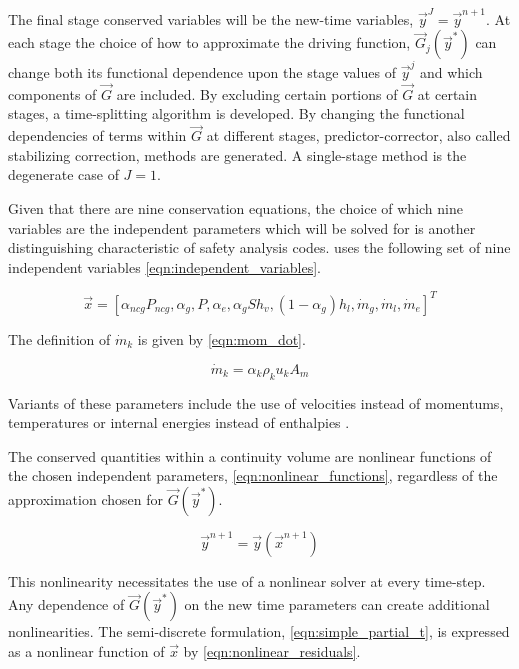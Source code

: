 The final stage conserved variables will be the new-time variables, $\vec{y}^{J} = \vec{y}^{n+1}$. 
At each stage the choice of how to approximate the driving function, $\vec{G}_{j}(\vec{y}^{*})$ can change both its functional dependence upon the stage values of $\vec{y}^{j}$ and which components of $\vec{G}$ are included.
By excluding certain portions of $\vec{G}$ at certain stages, a time-splitting algorithm is developed.
By changing the functional dependencies of terms within $\vec{G}$ at different stages, predictor-corrector, also called stabilizing correction, methods are generated. 
A single-stage method is the degenerate case of $J = 1$.

Given that there are nine conservation equations, the choice of which nine variables are the independent parameters which will be solved for is another distinguishing characteristic of safety analysis codes.
\cobra{} uses the following set of nine independent variables \eqref{eqn:independent_variables}.

\begin{equation}
\label{eqn:independent_variables}
\vec{x} = [\alpha_{ncg}P_{ncg}, \alpha_g, P, \alpha_e, \alpha_gS h_v, (1 - \alpha_g) h_l, \dot{m}_g, \dot{m}_l, \dot{m}_e]^{T}
\end{equation}

The definition of $\dot{m}_k$ is given by \eqref{eqn:mom_dot}.

\begin{equation}
\label{eqn:mom_dot}
\dot{m}_k = \alpha_k \rho_k u_k A_m
\end{equation}

Variants of these parameters include the use of velocities instead of momentums, temperatures or internal energies instead of enthalpies \cite{RELAP, TRACE}.

The conserved quantities within a continuity volume are nonlinear functions of the chosen independent parameters, \eqref{eqn:nonlinear_functions}, regardless of the approximation chosen for $\vec{G}(\vec{y}^{*})$.

\begin{equation}
\label{eqn:nonlinear_functions}
\vec{y}^{n+1} = \vec{y}(\vec{x}^{n+1})
\end{equation}

This nonlinearity necessitates the use of a nonlinear solver at every time-step.
Any dependence of $\vec{G}(\vec{y}^{*})$ on the new time parameters can create additional nonlinearities.
The semi-discrete formulation, \eqref{eqn:simple_partial_t}, is expressed as a nonlinear function of $\vec{x}$ by \eqref{eqn:nonlinear_residuals}.

